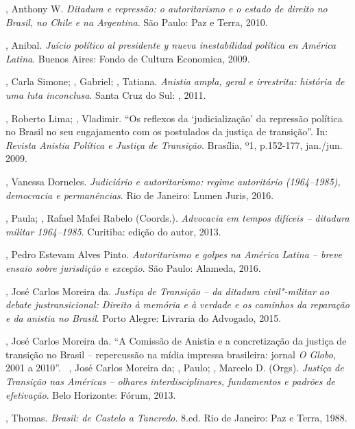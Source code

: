 \begin{Parskip}
, Anthony W. \emph{Ditadura e repressão: o autoritarismo e o
estado de direito no Brasil, no Chile e na Argentina}. São Paulo: Paz e
Terra, 2010.

, Anibal. \emph{Juício político al presidente y nueva
inestabilidad política en América Latina}. Buenos Aires: Fondo de
Cultura Economica, 2009.

, Carla Simone; , Gabriel; , Tatiana.
\emph{Anistia ampla, geral e irrestrita: história de uma luta
inconclusa}. Santa Cruz do Sul: , 2011.

, Roberto Lima;  , Vladimir. ``Os reflexos da
`judicialização' da repressão política no Brasil no seu engajamento com
os postulados da justiça de transição''. In: \emph{Revista Anistia
Política e Justiça de Transição}. Brasília, º1, p.152-177, jan./jun.
2009.

, Vanessa Dorneles. \emph{Judiciário e autoritarismo: regime
autoritário (1964--1985), democracia e permanências}. Rio de Janeiro:
Lumen Juris, 2016.

, Paula; , Rafael Mafei Rabelo (Coords.).
\emph{Advocacia em tempos difíceis -- ditadura militar 1964--1985}.
Curitiba: edição do autor, 2013.

, Pedro Estevam Alves Pinto. \emph{Autoritarismo e golpes na
América Latina -- breve ensaio sobre jurisdição e exceção}. São Paulo:
Alameda, 2016.

 , José Carlos Moreira da. \emph{Justiça de Transição -- da
ditadura civil"-militar ao debate justransicional: Direito à memória e à
verdade e os caminhos da reparação e da anistia no Brasil}. Porto Alegre:
Livraria do Advogado, 2015.

 , José Carlos Moreira da. ``A Comissão de Anistia e a
concretização da justiça de transição no Brasil -- repercussão na mídia
impressa brasileira: jornal \emph{O Globo}, 2001 a 2010''.~ , José
Carlos Moreira da; , Paulo; , Marcelo D. (Orgs).
\emph{Justiça de Transição nas Américas -- olhares interdisciplinares,
fundamentos e padrões de efetivação}. Belo Horizonte: Fórum, 2013.

, Thomas. \emph{Brasil: de Castelo a Tancredo}. 8.ed. Rio de
Janeiro: Paz e Terra, 1988.


\end{Parskip}
